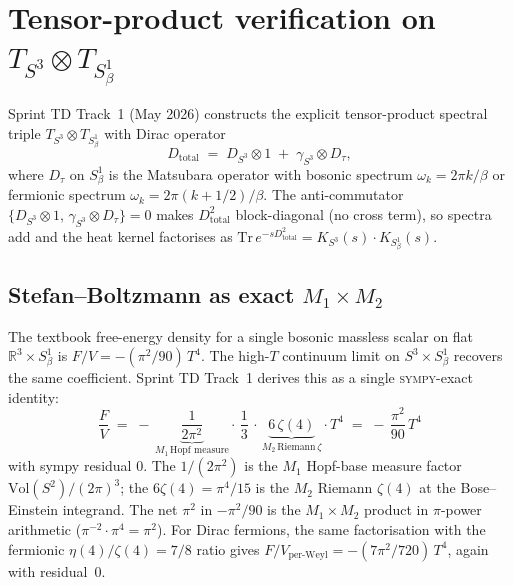 \documentclass[11pt]{article}
\begin{document}
\section{Tensor-product verification on $T_{S^3} \otimes T_{S^1_\beta}$}
\label{sec:tensor_product_verification}

Sprint TD Track~1 (May 2026) constructs the explicit tensor-product
spectral triple $T_{S^3} \otimes T_{S^1_\beta}$ with Dirac operator
\begin{equation}
\label{eq:D_total_thermal}
D_{\mathrm{total}} \;=\; D_{S^3} \otimes 1 \;+\; \gamma_{S^3} \otimes D_\tau,
\end{equation}
where $D_\tau$ on $S^1_\beta$ is the Matsubara operator with bosonic
spectrum $\omega_k = 2\pi k / \beta$ or fermionic spectrum
$\omega_k = 2\pi(k + 1/2) / \beta$.  The anti-commutator
$\{D_{S^3}\otimes 1,\, \gamma_{S^3}\otimes D_\tau\} = 0$ makes
$D_{\mathrm{total}}^2$ block-diagonal (no cross term), so spectra add
and the heat kernel factorises as
$\mathrm{Tr}\,e^{-s D_{\mathrm{total}}^2}
   = K_{S^3}(s)\cdot K_{S^1_\beta}(s)$.

\subsection{Stefan--Boltzmann as exact $M_1\times M_2$}
\label{subsec:sb_factorization}

The textbook free-energy density for a single bosonic massless scalar
on flat $\mathbb{R}^3 \times S^1_\beta$ is
$F/V = -(\pi^2/90)\,T^4$.  The high-$T$ continuum limit on
$S^3 \times S^1_\beta$ recovers the same coefficient.  Sprint TD
Track~1 derives this as a single \textsc{sympy}-exact identity:
\begin{equation}
\label{eq:sb_factorization}
\frac{F}{V}
\;=\; -\,\underbrace{\frac{1}{2\pi^2}}_{M_1\,\text{Hopf measure}}
       \cdot\, \frac{1}{3}\,
       \cdot\, \underbrace{6\,\zeta(4)}_{M_2\,\text{Riemann}\,\zeta} \cdot T^4
\;=\; -\,\frac{\pi^2}{90}\,T^4
\end{equation}
with sympy residual $0$.  The $1/(2\pi^2)$ is the $M_1$ Hopf-base
measure factor $\mathrm{Vol}(S^2)/(2\pi)^3$; the $6\zeta(4) = \pi^4/15$
is the $M_2$ Riemann $\zeta(4)$ at the Bose--Einstein integrand.  The
net $\pi^2$ in $-\pi^2/90$ is the $M_1\times M_2$ product in
$\pi$-power arithmetic ($\pi^{-2} \cdot \pi^4 = \pi^2$).  For Dirac
fermions, the same factorisation with the fermionic
$\eta(4)/\zeta(4) = 7/8$ ratio gives $F/V_{\mathrm{per\text{-}Weyl}}
= -(7\pi^2/720)\,T^4$, again with residual~$0$.
\end{document}
